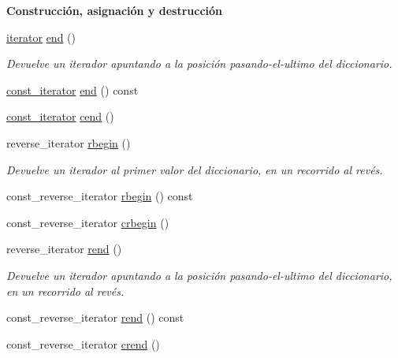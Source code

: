 \begin{Indent}{\bf \-Construcción, asignación y destrucción}
\begin{Indent}
\begin{DoxyCompactItemize}
\item 
\hyperlink{classaed2_1_1iterator_1_1iterator}{iterator} \hyperlink{classaed2_1_1iterator_a67caf9468be999e9be96b7add5d79946_a67caf9468be999e9be96b7add5d79946}{end} ()
\begin{DoxyCompactList}\small\item\em \-Devuelve un iterador apuntando a la posición pasando-\/el-\/ultimo del diccionario. \end{DoxyCompactList}\item 
\hyperlink{classaed2_1_1iterator_1_1const__iterator}{const\-\_\-iterator} \hyperlink{classaed2_1_1iterator_ae08e4f49cbbd2dfa756609aceb431633_ae08e4f49cbbd2dfa756609aceb431633}{end} () const 
\item 
\hyperlink{classaed2_1_1iterator_1_1const__iterator}{const\-\_\-iterator} \hyperlink{classaed2_1_1iterator_a2d0d226485d9280d16a739d0b9dae525_a2d0d226485d9280d16a739d0b9dae525}{cend} ()
\item 
reverse\-\_\-iterator \hyperlink{classaed2_1_1iterator_a296638725dce2fc10316d18563eb3131_a296638725dce2fc10316d18563eb3131}{rbegin} ()
\begin{DoxyCompactList}\small\item\em \-Devuelve un iterador al primer valor del diccionario, en un recorrido al revés. \end{DoxyCompactList}\item 
const\-\_\-reverse\-\_\-iterator \hyperlink{classaed2_1_1iterator_ae6b990a72769289b9cd0236a91c3b43f_ae6b990a72769289b9cd0236a91c3b43f}{rbegin} () const 
\item 
const\-\_\-reverse\-\_\-iterator \hyperlink{classaed2_1_1iterator_aa4b6ce667258581859351db42cfd3ee4_aa4b6ce667258581859351db42cfd3ee4}{crbegin} ()
\item 
reverse\-\_\-iterator \hyperlink{classaed2_1_1iterator_a0007a7962bc6aca8dca78c2a49bd581d_a0007a7962bc6aca8dca78c2a49bd581d}{rend} ()
\begin{DoxyCompactList}\small\item\em \-Devuelve un iterador apuntando a la posición pasando-\/el-\/ultimo del diccionario, en un recorrido al revés. \end{DoxyCompactList}\item 
const\-\_\-reverse\-\_\-iterator \hyperlink{classaed2_1_1iterator_a1230bf2063ce100c830129a24dea854d_a1230bf2063ce100c830129a24dea854d}{rend} () const 
\item 
const\-\_\-reverse\-\_\-iterator \hyperlink{classaed2_1_1iterator_a2e31ad7ded06c666c6c37c5d30bb41af_a2e31ad7ded06c666c6c37c5d30bb41af}{crend} ()
\end{DoxyCompactItemize}
\end{Indent}

\end{Indent}
